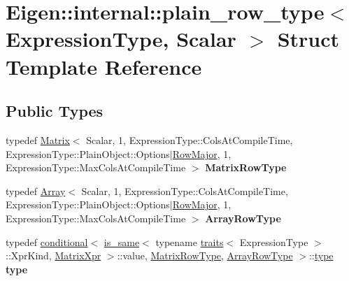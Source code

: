 \hypertarget{struct_eigen_1_1internal_1_1plain__row__type}{}\section{Eigen\+:\+:internal\+:\+:plain\+\_\+row\+\_\+type$<$ Expression\+Type, Scalar $>$ Struct Template Reference}
\label{struct_eigen_1_1internal_1_1plain__row__type}
\subsection*{Public Types}
\begin{DoxyCompactItemize}
\item 
\mbox{\label{struct_eigen_1_1internal_1_1plain__row__type_a499e20b59c8b2a229039780dc9fb6ced}} 
typedef \hyperlink{group___core___module_class_eigen_1_1_matrix}{Matrix}$<$ Scalar, 1, Expression\+Type\+::\+Cols\+At\+Compile\+Time, Expression\+Type\+::\+Plain\+Object\+::\+Options$\vert$\hyperlink{group__enums_ggaacded1a18ae58b0f554751f6cdf9eb13acfcde9cd8677c5f7caf6bd603666aae3}{Row\+Major}, 1, Expression\+Type\+::\+Max\+Cols\+At\+Compile\+Time $>$ {\bfseries Matrix\+Row\+Type}
\item 
\mbox{\label{struct_eigen_1_1internal_1_1plain__row__type_abff896fa5a71cc838b47e38bd58bb561}} 
typedef \hyperlink{group___core___module_class_eigen_1_1_array}{Array}$<$ Scalar, 1, Expression\+Type\+::\+Cols\+At\+Compile\+Time, Expression\+Type\+::\+Plain\+Object\+::\+Options$\vert$\hyperlink{group__enums_ggaacded1a18ae58b0f554751f6cdf9eb13acfcde9cd8677c5f7caf6bd603666aae3}{Row\+Major}, 1, Expression\+Type\+::\+Max\+Cols\+At\+Compile\+Time $>$ {\bfseries Array\+Row\+Type}
\item 
\mbox{\label{struct_eigen_1_1internal_1_1plain__row__type_afd854af5b54f4843ccb5d712fcadd462}} 
typedef \hyperlink{struct_eigen_1_1internal_1_1conditional}{conditional}$<$ \hyperlink{struct_eigen_1_1internal_1_1is__same}{is\+\_\+same}$<$ typename \hyperlink{struct_eigen_1_1internal_1_1traits}{traits}$<$ Expression\+Type $>$\+::Xpr\+Kind, \hyperlink{struct_eigen_1_1_matrix_xpr}{Matrix\+Xpr} $>$\+::value, \hyperlink{group___core___module_class_eigen_1_1_matrix}{Matrix\+Row\+Type}, \hyperlink{group___core___module_class_eigen_1_1_array}{Array\+Row\+Type} $>$\+::\hyperlink{class_eigen_1_1internal_1_1_tensor_lazy_evaluator_writable}{type} {\bfseries type}

\end{DoxyCompactItemize}
